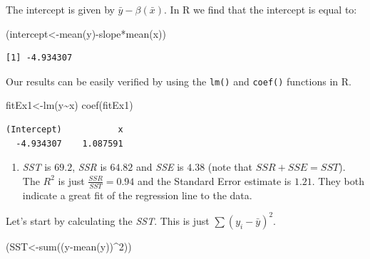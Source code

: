 \documentclass[
  letterpaper,
  DIV=11,
  numbers=noendperiod]{scrreprt}
\newenvironment{Shaded}{\begin{snugshade}}{\end{snugshade}}
\newcommand{\DecValTok}[1]{\textcolor[rgb]{0.68,0.00,0.00}{#1}}
\newcommand{\FunctionTok}[1]{\textcolor[rgb]{0.28,0.35,0.67}{#1}}
\newcommand{\NormalTok}[1]{\textcolor[rgb]{0.00,0.23,0.31}{#1}}
\newcommand{\OtherTok}[1]{\textcolor[rgb]{0.00,0.23,0.31}{#1}}
\newcommand{\SpecialCharTok}[1]{\textcolor[rgb]{0.37,0.37,0.37}{#1}}
\providecommand{\tightlist}{%
  \setlength{\itemsep}{0pt}\setlength{\parskip}{0pt}}\usepackage{longtable,booktabs,array}
\begin{document}
The intercept is given by \(\bar{y}-\beta(\bar{x})\). In R we find that
the intercept is equal to:

\begin{Shaded}
\begin{Highlighting}[numbers=left,,]
\NormalTok{(intercept}\OtherTok{\textless{}{-}}\FunctionTok{mean}\NormalTok{(y)}\SpecialCharTok{{-}}\NormalTok{slope}\SpecialCharTok{*}\FunctionTok{mean}\NormalTok{(x))}
\end{Highlighting}
\end{Shaded}

\begin{verbatim}
[1] -4.934307
\end{verbatim}

Our results can be easily verified by using the \texttt{lm()} and
\texttt{coef()} functions in R.

\begin{Shaded}
\begin{Highlighting}[numbers=left,,]
\NormalTok{fitEx1}\OtherTok{\textless{}{-}}\FunctionTok{lm}\NormalTok{(y}\SpecialCharTok{\textasciitilde{}}\NormalTok{x)}
\FunctionTok{coef}\NormalTok{(fitEx1)}
\end{Highlighting}
\end{Shaded}

\begin{verbatim}
(Intercept)           x 
  -4.934307    1.087591 
\end{verbatim}

\begin{blackbox}

\begin{enumerate}
\def\labelenumi{\arabic{enumi}.}
\setcounter{enumi}{1}
\tightlist
\item
  \emph{SST} is \(69.2\), \emph{SSR} is \(64.82\) and \emph{SSE} is
  \(4.38\) (note that \(SSR+SSE=SST\)). The \(R^2\) is just
  \(\frac{SSR}{SST}=0.94\) and the Standard Error estimate is \(1.21\).
  They both indicate a great fit of the regression line to the data.
\end{enumerate}

\end{blackbox}

Let's start by calculating the \emph{SST}. This is just
\(\sum{(y_{i}-\bar{y})^2}\).

\begin{Shaded}
\begin{Highlighting}[numbers=left,,]
\NormalTok{(SST}\OtherTok{\textless{}{-}}\FunctionTok{sum}\NormalTok{((y}\SpecialCharTok{{-}}\FunctionTok{mean}\NormalTok{(y))}\SpecialCharTok{\^{}}\DecValTok{2}\NormalTok{))}
\end{Highlighting}
\end{Shaded}
\end{document}

